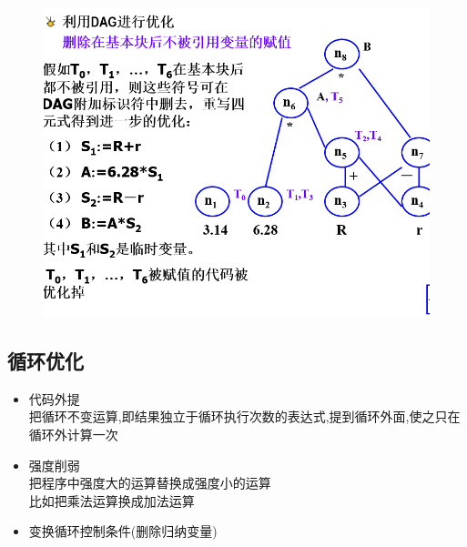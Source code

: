 \documentclass[UTF8,a4paper]{ctexart}
\begin{document}
\begin{figure}[H]
 \centering
 \includegraphics[scale = 0.3]{assets/CompilerConstructionPrinciples_e1d5a.png}
\end{figure}

\subsection{循环优化}
\begin{itemize}
 \item 代码外提\\
       把循环不变运算,即结果独立于循环执行次数的表达式,提到循环外面,使之只在循环外计算一次
 \item 强度削弱\\
       把程序中强度大的运算替换成强度小的运算\\
       比如把乘法运算换成加法运算
 \item 变换循环控制条件(删除归纳变量)
\end{itemize}
\end{document}
